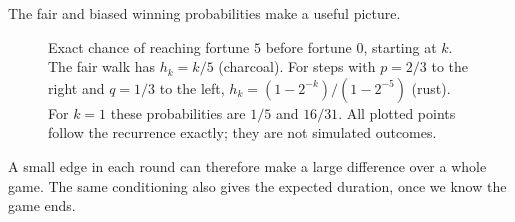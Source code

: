 The fair and biased winning probabilities make a useful picture.

\begin{figure}[ht]
\centering
{}
\caption{Exact chance of reaching fortune $5$ before fortune $0$, starting at $k$. The fair walk has $h_k=k/5$ (charcoal). For steps with $p=2/3$ to the right and $q=1/3$ to the left, $h_k=(1-2^{-k})/(1-2^{-5})$ (rust). For $k=1$ these probabilities are $1/5$ and $16/31$. All plotted points follow the recurrence exactly; they are not simulated outcomes.}
\label{fig:ruincompare}
\end{figure}

A small edge in each round can therefore make a large difference over a whole game. The same conditioning also gives the expected duration, once we know the game ends.

